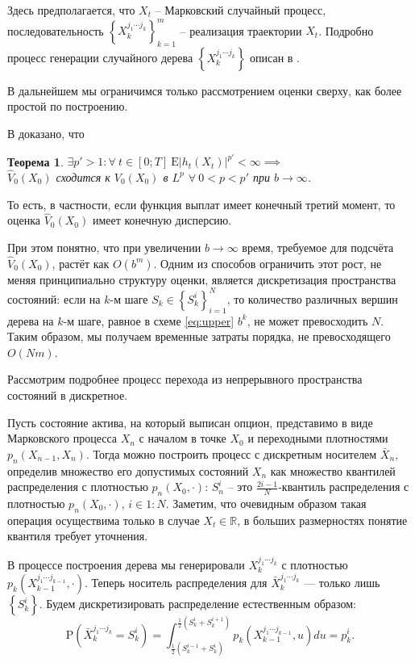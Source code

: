 \documentclass[specialist,
               substylefile = ../spbu.rtx,
               subf,href,colorlinks=true, 12pt]{disser}
\newtheorem{theorem}{Теорема}
\newcommand{\ev}{\mathrm{E}}
\newcommand{\prob}[1]{\mathrm{P}\left(#1\right)}
\newcommand{\R}{\ensuremath{\mathbb{R}}}
\newcommand{\Vhat}{\hat{V}}
\begin{document}
    Здесь предполагается, что $X_t$ -- Марковский случайный процесс, последовательность $\left\lbrace X_k^{j_1\cdots j_k}\right\rbrace_{k=1}^m$ -- реализация траектории $X_t$. Подробно процесс генерации случайного дерева $\left\lbrace X_k^{j_1\cdots j_k}\right\rbrace$ описан в \cite{Broadie2004}.

    В дальнейшем мы ограничимся только рассмотрением оценки сверху, как более простой по построению. 

    В \cite{Broadie1997} доказано, что 
    \begin{theorem}
        $\exists p' > 1: \forall\: t \in \left[0; T\right]\: \ev \left\vert h_t\left(X_t\right)\right\vert ^{p'} < \infty \implies$ \\
        $\Vhat_0(X_0)$ сходится к $V_0(X_0)$ в $L^p$ $\forall\: 0 < p < p'$ при $b \to \infty$.
    \end{theorem}
    То есть, в частности, если функция выплат имеет конечный третий момент, то оценка $\Vhat_0(X_0)$ имеет конечную дисперсию.

    При этом понятно, что при увеличении $b \to\infty$ время, требуемое для подсчёта $\Vhat_0(X_0)$, растёт как $O\left(b^m\right)$. Одним из способов ограничить этот рост, не меняя принципиально структуру оценки, является дискретизация пространства состояний: если на $k$-м шаге $S_k \in \left\lbrace S_k^i\right\rbrace_{i=1}^N$, то количество различных вершин дерева на $k$-м шаге, равное в схеме \eqref{eq:upper} $b^k$, не может превосходить $N$. Таким образом, мы получаем временные затраты порядка, не превосходящего $O(Nm)$.

    Рассмотрим подробнее процесс перехода из непрерывного пространства состояний в дискретное. 

    Пусть состояние актива, на который выписан опцион, представимо в виде Марковского процесса $X_n$ с началом в точке $X_0$ и переходными плотностями $p_n(X_{n-1}, X_n)$. Тогда можно построить процесс с дискретным носителем $\bar X_n$, определив множество его допустимых состояний $X_n$ как множество квантилей распределения с плотностью $p_n\left(X_0, \cdot\right)$: $S_n^i$ -- это $\frac{2i - 1}{N}$-квантиль распределения с плотностью $p_n\left(X_0, \cdot\right)$, $i\in 1\mathbin{:} N$. Заметим, что очевидным образом такая операция осуществима только в случае $X_t\in\R$, в больших размерностях понятие квантиля требует уточнения.

    В процессе построения дерева мы генерировали $X_k^{j_1\cdots j_k}$ с плотностью $p_k\left(X_{k-1}^{j_1\cdots j_{k-1}}, \cdot \right)$. Теперь носитель распределения для $\bar X_k^{j_1\cdots j_k}$ --- только лишь $\left\lbrace S_k^i\right\rbrace$. Будем дискретизировать распределение естественным образом:
    \[
        \prob{\bar X_k^{j_1\cdots j_k} = S_k^i} = \int_{\frac{1}{2}\left(S_k^{i-1} + S_k^{i}\right)}^{\frac{1}{2}\left(S_k^{i} + S_k^{i+1}\right)} p_k\left(X_{k-1}^{j_1\cdots j_{k-1}}, u\right) du = p_k^i.
    \]
\end{document}
